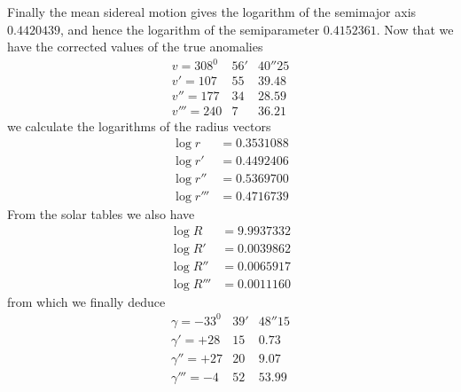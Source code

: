 Finally the mean sidereal motion gives the logarithm of the semimajor axis $0.4420439$, and hence the logarithm of the semiparameter $0.4152361$. Now that we have the corrected values of the true anomalies
\SourceGathering{2\textsuperscript{*}}
\[
\begin{array}{rrr}
v=308^0&56'&40''25\\
v'=107&55&39.48\\
v''=177&34&28.59\\
v'''=240&7&36.21
\end{array}
\]
we calculate the logarithms of the radius vectors
\[
\begin{aligned}
\log r&=0.3531088\\
\log r'&=0.4492406\\
\log r''&=0.5369700\\
\log r'''&=0.4716739
\end{aligned}
\]
From the solar tables we also have
\[
\begin{aligned}
\log R&=9.9937332\\
\log R'&=0.0039862\\
\log R''&=0.0065917\\
\log R'''&=0.0011160
\end{aligned}
\]
from which we finally deduce
\[
\begin{array}{rrr}
\gamma=-33^0&39'&48''15\\
\gamma'=+28&15&0.73\\
\gamma''=+27&20&9.07\\
\gamma'''=-4&52&53.99
\end{array}
\]

